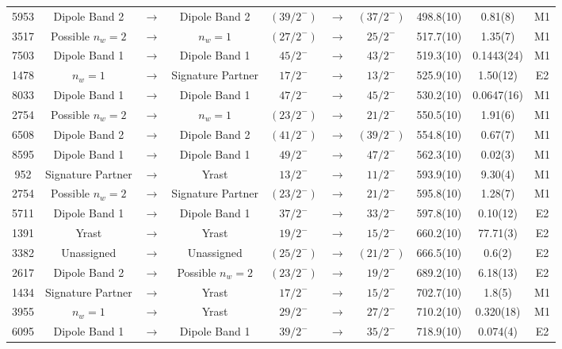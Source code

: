 \begin{landscape}
\begin{center}
\begin{longtable}{|c|ccc|ccc|c|c|c|}
 5953 &Dipole Band 2&$ \rightarrow $&Dipole Band 2&$ (39/2^{-}) $&$ \rightarrow $&$ (37/2^{-}) $& 498.8(10) & 0.81(8) & M1 \\
 3517 &Possible $n_w=2$&$ \rightarrow $&$n_w=1$&$ (27/2^{-}) $&$ \rightarrow $&$ 25/2^{-} $& 517.7(10) & 1.35(7) & M1 \\
 7503 &Dipole Band 1&$ \rightarrow $&Dipole Band 1&$ 45/2^{-} $&$ \rightarrow $&$ 43/2^{-} $& 519.3(10) & 0.1443(24) & M1 \\
 1478 &$n_w=1$&$ \rightarrow $&Signature Partner&$ 17/2^{-} $&$ \rightarrow $&$ 13/2^{-} $& 525.9(10) & 1.50(12) & E2 \\
 8033 &Dipole Band 1&$ \rightarrow $&Dipole Band 1&$ 47/2^{-} $&$ \rightarrow $&$ 45/2^{-} $& 530.2(10) & 0.0647(16) & M1 \\
 2754 &Possible $n_w=2$&$ \rightarrow $&$n_w=1$&$ (23/2^{-}) $&$ \rightarrow $&$ 21/2^{-} $& 550.5(10) & 1.91(6) & M1 \\
 6508 &Dipole Band 2&$ \rightarrow $&Dipole Band 2&$ (41/2^{-}) $&$ \rightarrow $&$ (39/2^{-}) $& 554.8(10) & 0.67(7) & M1 \\
 8595 &Dipole Band 1&$ \rightarrow $&Dipole Band 1&$ 49/2^{-} $&$ \rightarrow $&$ 47/2^{-} $& 562.3(10) & 0.02(3) & M1 \\
 952 &Signature Partner&$ \rightarrow $&Yrast&$ 13/2^{-} $&$ \rightarrow $&$ 11/2^{-} $& 593.9(10) & 9.30(4) & M1 \\
 2754 &Possible $n_w=2$&$ \rightarrow $&Signature Partner&$ (23/2^{-}) $&$ \rightarrow $&$ 21/2^{-} $& 595.8(10) & 1.28(7) & M1 \\
 5711 &Dipole Band 1&$ \rightarrow $&Dipole Band 1&$ 37/2^{-} $&$ \rightarrow $&$ 33/2^{-} $& 597.8(10) & 0.10(12) & E2 \\
 1391 &Yrast&$ \rightarrow $&Yrast&$ 19/2^{-} $&$ \rightarrow $&$ 15/2^{-} $& 660.2(10) & 77.71(3) & E2 \\
 3382 &Unassigned&$ \rightarrow $&Unassigned&$ (25/2^{-}) $&$ \rightarrow $&$ (21/2^{-}) $& 666.5(10) & 0.6(2) & E2 \\
 2617 &Dipole Band 2&$ \rightarrow $&Possible $n_w=2$&$ (23/2^{-}) $&$ \rightarrow $&$ 19/2^{-} $& 689.2(10) & 6.18(13) & E2 \\
 1434 &Signature Partner&$ \rightarrow $&Yrast&$ 17/2^{-} $&$ \rightarrow $&$ 15/2^{-} $& 702.7(10) & 1.8(5) & M1 \\
 3955 &$n_w=1$&$ \rightarrow $&Yrast&$ 29/2^{-} $&$ \rightarrow $&$ 27/2^{-} $& 710.2(10) & 0.320(18) & M1 \\
 6095 &Dipole Band 1&$ \rightarrow $&Dipole Band 1&$ 39/2^{-} $&$ \rightarrow $&$ 35/2^{-} $& 718.9(10) & 0.074(4) & E2 \\

\end{longtable}
\end{center}
\end{landscape}
